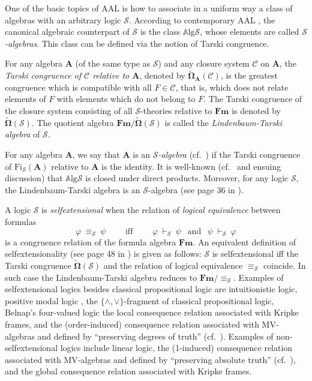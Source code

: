 \documentclass{llncs}
\numberwithin{equation}{section}
\newcommand{\Sm}{\mathcal{S}}   \newcommand{\Lm}{\mathcal{L}}  \newcommand{\Fm}{\mathbf{Fm}}  \newcommand{\Hom}{\mathrm{Hom}}   \newcommand{\Al}{\mathbf{A}}  \newcommand{\BB}{\mathbf{B}}   \newcommand{\Alg}{\mathbb{A}\mathrm{lg}}
\newcommand{\SSS}{\mathcal{S}}
\newcommand{\aAA}{\boldsymbol{A}}
\newcommand{\Fi}{\mathrm{Fi}}
\begin{document}
One of the basic topics of AAL is how to associate in a uniform way a class of algebras with an arbitrary logic $\Sm$. According to contemporary AAL \cite{FJa09}, the canonical algebraic counterpart of $\Sm$  is the class $\Alg\Sm$, whose elements are called \emph{$\Sm$-algebras}. This class can be defined via the notion of Tarski congruence.

For any algebra $\Al$ (of the same type as $\Sm$) and any closure system $\mathcal{C}$ on $\Al$,
the \emph{Tarski congruence of $\mathcal{C}$ relative to $\Al$},  denoted by $\tilde{\mathbf{\Omega}}_{\Al}(\mathcal{C})$,
is the greatest congruence which is compatible with all $F\in \mathcal{C}$, that is, which does not relate elements of $F$ with elements which do not belong to $F$.
The Tarski congruence of the closure system consisting of all $\Sm$-theories relative to $\Fm$ is denoted by $\tilde{\mathbf{\Omega}}(\Sm)$. The quotient algebra $\Fm/\tilde{\mathbf{\Omega}}(\Sm)$ is called the \emph{Lindenbaum-Tarski algebra} of $\Sm$.

For any algebra $\Al$, we say that $\Al$ is an \emph{$\Sm$-algebra}  (cf.\ \cite[Definition 2.16]{FJa09}) if the Tarski congruence of $\Fi_{\SSS}(\aAA)$ relative to $\Al$ is the identity. It is well-known (cf.\ \cite[Theorem 2.23]{FJa09} and ensuing discussion) that $\Alg\Sm$ is closed under direct products. Moreover, for any logic $\Sm$, the Lindenbaum-Tarski algebra is an $\Sm$-algebra (see page 36 in \cite{FJa09}).

A logic $\Sm$ is \emph{selfextensional} when the relation of \emph{logical equivalence} between formulas
$$\varphi\ {\equiv_{\Sm}}\ \psi\quad\quad\mbox{ iff }\quad\quad\varphi\ {\vdash_{\Sm}}\ \psi\ \ \mbox{ and }\ \ \psi\ {\vdash_{\Sm}}\ \varphi$$
is a congruence relation of the formula algebra $\Fm$.
An equivalent definition of selfextensionality (see page 48 in \cite{FJa09}) is given as follows: $\Sm$ is selfextensional iff  the Tarski congruence $\tilde{\mathbf{\Omega}}(\Sm)$ and the relation of logical equivalence $\equiv_{\Sm}$ coincide. In such case the Lindenbaum-Tarski algebra reduces to ${\Fm/\equiv_{\Sm}}$. Examples of selfextensional logics besides classical propositional logic are intuitionistic logic, positive modal logic \cite{CeJa99}, the $\{\land, \lor\}$-fragment of classical propositional logic,  Belnap's four-valued logic \cite{Be77} the local consequence relation associated with Kripke frames, and the (order-induced) consequence relation associated with MV-algebras and defined by ``preserving degrees of truth'' (cf.\ \cite{Fo03}). Examples of non-selfextensional logics include linear logic, the (1-induced) consequence relation associated with MV-algebras and defined by ``preserving absolute truth'' (cf.\ \cite{Fo03}), and the global consequence relation associated with Kripke frames.
\end{document}
